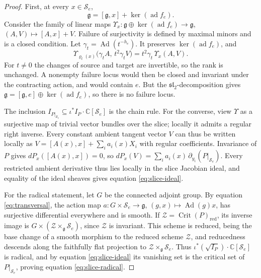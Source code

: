 \documentclass[10pt,reqno]{amsart}
\numberwithin{equation}{section}
\theoremstyle{plain}
\theoremstyle{definition}
\DeclareMathOperator{\Crit}{Crit}
\DeclareMathOperator{\ad}{ad}
\DeclareMathOperator{\Ad}{Ad}
\newcommand{\red}{\mathrm{red}}
\begin{document}
\begin{proof}
First, at every $x\in\mathcal{S}_e$,
\begin{equation}\label{eq:transversal}
	\mathfrak{g}=[\mathfrak{g},x]+\ker(\ad f_e).
\end{equation}
Consider the family of linear maps $\Upsilon_x:\mathfrak{g}\oplus\ker(\ad f_e)\to\mathfrak{g}$, $(A,V)\mapsto[A,x]+V$. Failure of surjectivity is defined by maximal minors and is a closed condition. Let $\gamma_t=\Ad(t^{-h_e})$. It preserves $\ker(\ad f_e)$, and
\begin{equation*}
	\Upsilon_{\varrho_t(x)}\big(\gamma_tA,\,t^2\gamma_tV\big)=t^2\gamma_t\,\Upsilon_x(A,V).
\end{equation*}
For $t\neq0$ the changes of source and target are invertible, so the rank is unchanged. A nonempty failure locus would then be closed and invariant under the contracting action, and would contain $e$. But the $\mathfrak{sl}_2$-decomposition gives $\mathfrak{g}=[\mathfrak{g},e]\oplus\ker(\ad f_e)$, so there is no failure locus.

The inclusion $I_{P|_{\mathcal{S}_e}}\subseteq\iota^*I_P\cdot\mathbb{C}[\mathcal{S}_e]$ is the chain rule. For the converse, view $\Upsilon$ as a surjective map of trivial vector bundles over the slice; locally it admits a regular right inverse. Every constant ambient tangent vector $V$ can thus be written locally as $V=[A(x),x]+\sum_ia_i(x)X_i$ with regular coefficients. Invariance of $P$ gives $dP_x([A(x),x])=0$, so $dP_x(V)=\sum_ia_i(x)\,\partial_{y_i}(P|_{\mathcal{S}_e})$. Every restricted ambient derivative thus lies locally in the slice Jacobian ideal, and equality of the ideal sheaves gives equation \eqref{eq:slice-ideal}.

For the radical statement, let $G$ be the connected adjoint group. By equation \eqref{eq:transversal}, the action map $a:G\times\mathcal{S}_e\to\mathfrak{g}$, $(g,x)\mapsto\Ad(g)x$, has surjective differential everywhere and is smooth. If $\mathcal{Z}=\Crit(P)_\red$, its inverse image is $G\times(\mathcal{Z}\times_\mathfrak{g}\mathcal{S}_e)$, since $\mathcal{Z}$ is invariant. This scheme is reduced, being the base change of a smooth morphism to the reduced scheme $\mathcal{Z}$, and reducedness descends along the faithfully flat projection to $\mathcal{Z}\times_\mathfrak{g}\mathcal{S}_e$. Thus $\iota^*(\sqrt{I_P})\cdot\mathbb{C}[\mathcal{S}_e]$ is radical, and by equation \eqref{eq:slice-ideal} its vanishing set is the critical set of $P|_{\mathcal{S}_e}$, proving equation \eqref{eq:slice-radical}.
\end{proof}
\end{document}
